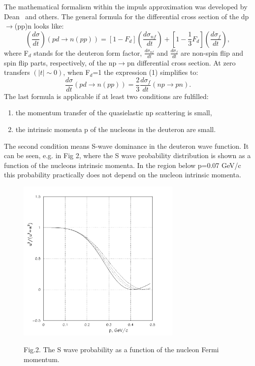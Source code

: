 \documentclass[a4paper,12pt]{article}
\begin{document}
The mathematical formalism within the impuls approximation was developed
by Dean~\cite{Dea} and others. The general formula for the differential
cross section of the dp$\to$(pp)n looks like:
\begin{equation}
  \left( \frac{d\sigma }{dt}\right) (pd\rightarrow n(pp))=[1-F_d]\left(
  \frac{d\sigma _{nf}}{dt}\right) +[1-\frac{1}{3}F_d]
  \left(\frac{d\sigma _f}{dt}\right),
\end{equation}
where F$_d$ stands for the deuteron form factor, $\frac{d\sigma _{nf}}{dt}$ and
$\frac{d\sigma _f}{dt}$ are non-spin flip and spin flip parts, respectively,
of the np$\to$pn differential cross section. At zero transfers
$(\vert t \vert\sim 0)$, when F$_d$=1 the expression (1) simplifies to:
\begin{equation}
  \frac{d\sigma }{dt}(pd\rightarrow n(pp))=\frac 23\frac{d\sigma _f}
       {dt}(np\rightarrow pn).
\end{equation}
The last formula is applicable if at least two conditions are fulfilled:
\begin{enumerate}
\item the momentum transfer of the quasielastic np scattering is small,
\item the intrinsic momenta p of the nucleons in the deuteron are small.
\end{enumerate}

The second condition means S-wave dominance in the deuteron wave function.
It can be seen, e.g. in Fig 2, where the S wave probability distribution
is shown as a function of the nucleons intrinsic momenta. In the region
below p=0.07 GeV/c this probability practically does not depend on the nucleon
intrinsic momenta.

\begin{figure}[hbt]
  \begin{center}
    \includegraphics[width=8cm]{wavedtr.pdf}
  \end{center}
  \vspace{0.4mm}
  Fig.2. The S wave probability as a function of the nucleon Fermi momentum. \\

\end{figure}
\end{document}
